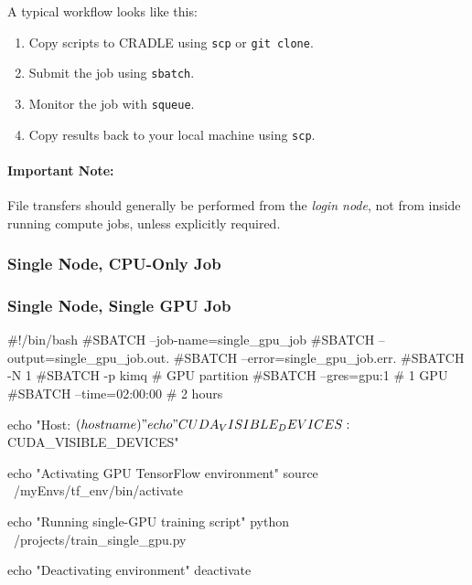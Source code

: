 \documentclass[11pt]{article}
\begin{document}
A typical workflow looks like this:
\begin{enumerate}
  \item Copy scripts to CRADLE using \texttt{scp} or \texttt{git clone}.
  \item Submit the job using \texttt{sbatch}.
  \item Monitor the job with \texttt{squeue}.
  \item Copy results back to your local machine using \texttt{scp}.
\end{enumerate}

\paragraph{Important Note:}
File transfers should generally be performed from the \emph{login node},
not from inside running compute jobs, unless explicitly required.


\subsubsection{Single Node, CPU-Only Job}
\label{subsubsec:cpu-only-job}


\subsubsection{Single Node, Single GPU Job}
\label{subsubsec:single-gpu-job}

\begin{codeblock}
#!/bin/bash
#SBATCH --job-name=single_gpu_job
#SBATCH --output=single_gpu_job.out.%
#SBATCH --error=single_gpu_job.err.%
#SBATCH -N 1
#SBATCH -p kimq           # GPU partition
#SBATCH --gres=gpu:1      # 1 GPU
#SBATCH --time=02:00:00   # 2 hours

echo "Host: $(hostname)"
echo "CUDA_VISIBLE_DEVICES: $CUDA_VISIBLE_DEVICES"

echo "Activating GPU TensorFlow environment"
source ~/myEnvs/tf_env/bin/activate

echo "Running single-GPU training script"
python ~/projects/train_single_gpu.py

echo "Deactivating environment"
deactivate
\end{codeblock}
\end{document}
